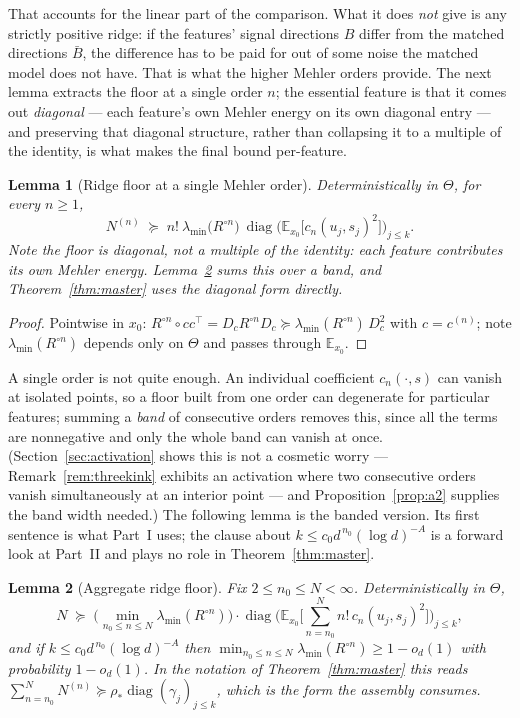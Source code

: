 \documentclass[11pt]{article}
\newtheorem{lemma}{Lemma}
\theoremstyle{remark}
\newcommand{\E}{\mathbb{E}}
\newcommand{\diag}{\operatorname{diag}}
\newcommand{\lmin}{\lambda_{\min}}
\begin{document}
\noindent That accounts for the linear part of the comparison. What it does \emph{not} give is any strictly positive ridge: if the features' signal directions $B$ differ from the matched directions $\bar B$, the difference has to be paid for out of some noise the matched model does not have. That is what the higher Mehler orders provide. The next lemma extracts the floor at a single order $n$; the essential feature is that it comes out \emph{diagonal} --- each feature's own Mehler energy on its own diagonal entry --- and preserving that diagonal structure, rather than collapsing it to a multiple of the identity, is what makes the final bound per-feature.

\begin{lemma}[Ridge floor at a single Mehler order]\label{lem:floor}
Deterministically in $\Theta$, for every $n \ge 1$,
\[
N^{(n)} \;\succeq\; n!\ \lmin\!\big(R^{\circ n}\big)\ \diag\!\Big(\E_{x_0}\big[c_{n}(u_j, s_j)^2\big]\Big)_{j\le k} .
\]
Note the floor is \emph{diagonal}, not a multiple of the identity: each feature contributes its own Mehler energy. Lemma~\ref{lem:agg} sums this over a band, and Theorem~\ref{thm:master} uses the diagonal form directly.
\end{lemma}

\begin{proof}
Pointwise in $x_0$: $R^{\circ n}\circ c c^\top = D_c R^{\circ n} D_c \succeq \lmin(R^{\circ n})\, D_c^2$ with $c = c^{(n)}$; note $\lmin(R^{\circ n})$ depends only on $\Theta$ and passes through $\E_{x_0}$.
\end{proof}

\noindent A single order is not quite enough. An individual coefficient $c_n(\cdot,s)$ can vanish at isolated points, so a floor built from one order can degenerate for particular features; summing a \emph{band} of consecutive orders removes this, since all the terms are nonnegative and only the whole band can vanish at once. (Section~\ref{sec:activation} shows this is not a cosmetic worry --- Remark~\ref{rem:threekink} exhibits an activation where two consecutive orders vanish simultaneously at an interior point --- and Proposition~\ref{prop:a2} supplies the band width needed.) The following lemma is the banded version. Its first sentence is what Part~I uses; the clause about $k \le c_0d^{\,n_0}(\log d)^{-A}$ is a forward look at Part~II and plays no role in Theorem~\ref{thm:master}.

\begin{lemma}[Aggregate ridge floor]\label{lem:agg}
Fix $2 \le n_0 \le N < \infty$. Deterministically in $\Theta$,
\[
N \;\succeq\; \Big(\min_{n_0 \le n \le N}\lmin(R^{\circ n})\Big)\cdot
\diag\Big(\E_{x_0}\Big[\textstyle\sum_{n=n_0}^{N} n!\,c_n(u_j,s_j)^2\Big]\Big)_{j \le k},
\]
and if $k \le c_0 d^{\,n_0}(\log d)^{-A}$ then $\min_{n_0\le n\le N}\lmin(R^{\circ n}) \ge 1 - o_d(1)$ with probability $1 - o_d(1)$. In the notation of Theorem~\ref{thm:master} this reads $\sum_{n=n_0}^N N^{(n)} \succeq \rho_*\diag(\gamma_j)_{j\le k}$, which is the form the assembly consumes.
\end{lemma}
\end{document}
